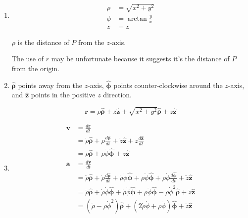 \documentclass{article}
\renewcommand{\vec}[1]{\boldsymbol{\mathbf{#1}}}
\newcommand{\uvec}[1]{\hat{\vec{#1}}}
\begin{document}
\begin{enumerate}
  \item

        \begin{align*}
          \rho & = \sqrt{x^2 + y^2}    \\
          \phi & = \arctan \frac{y}{x} \\
          z    & = z
        \end{align*}

        $\rho$ is the distance of $P$ from the $z$-axis.

        The use of $r$ may be unfortunate because it suggests it's the distance of $P$ from the origin.

  \item $\uvec{\rho}$ points away from the $z$-axis, $\uvec{\phi}$ points counter-clockwise around the $z$-axis, and $\uvec{z}$ points in the positive $z$ direction.

        \[\vec{r} = \rho \uvec{\rho} + z \uvec{z} + \sqrt{x^2 + y^2} \uvec{\rho} + z \uvec{z}\]

  \item

        \begin{align*}
          \vec{v} & = \frac{d \vec{r}}{d t}                                                                                                                                                                             \\
                  & = \dot{\rho} \uvec{\rho} + \rho \frac{d \uvec{\rho}}{d t} + \dot{z} \uvec{z} + z \frac{d \uvec{z}}{d t}                                                                                             \\
                  & = \dot{\rho} \uvec{\rho} + \rho \dot{\phi} \uvec{\phi} + \dot{z} \uvec{z}                                                                                                                           \\
          \vec{a} & = \frac{d \vec{v}}{d t}                                                                                                                                                                             \\
                  & = \ddot{\rho} \uvec{\rho} + \dot{\rho} \frac{d \uvec{\rho}}{d t} + \dot{\rho} \dot{\phi} \uvec{\phi} + \rho \ddot{\phi} \uvec{\phi} + \rho \dot{\phi} \frac{d \uvec{\phi}}{d t} + \ddot{z} \uvec{z} \\
                  & = \ddot{\rho} \uvec{\rho} + \dot{\rho} \dot{\phi} \uvec{\phi} + \dot{\rho} \dot{\phi} \uvec{\phi} + \rho \ddot{\phi} \uvec{\phi} - \rho \dot{\phi}^2 \uvec{\rho} + \ddot{z} \uvec{z}                \\
                  & = (\ddot{\rho} - \rho \dot{\phi}^2) \uvec{\rho} + (2 \dot{\rho} \dot{\phi} + \rho \ddot{\phi}) \uvec{\phi} + \ddot{z} \uvec{z}
        \end{align*}
\end{enumerate}
\end{document}
